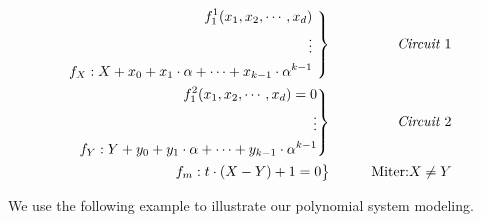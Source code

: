 \begin{eqnarray}\label{eqn:miterbit}
 \left .  \begin{aligned}
f_1^{1}(x_1,x_2,\cdots, x_d)  \\
\vdots  \\
f_{X}: X+x_{0}+x_{1}\cdot \alpha+\dots+ x_{k-1}\cdot \alpha^{k-1} \\
 \end{aligned} 
\ \right\}
 &\qquad&  \text{\it Circuit $1$} \nonumber \\
 \left . \begin{aligned}
f_1^{2}(x_1,x_2,\cdots, x_d)=0  \\
\vdots  \\
f_{Y}: Y+y_{0}+y_{1}\cdot \alpha+\dots+ y_{k-1}\cdot \alpha^{k-1} \\
 \end{aligned} 
\right\}
 &\qquad&  \text{\it  Circuit $2$}  \\
 \left .  \begin{aligned}
f_{m}:t\cdot (X-Y)+1=0  \nonumber 
 \end{aligned} 
\right\}
 &\qquad& \text{Miter:}X \neq Y \nonumber 
\end{eqnarray}

We use the following example to illustrate our polynomial system modeling.

